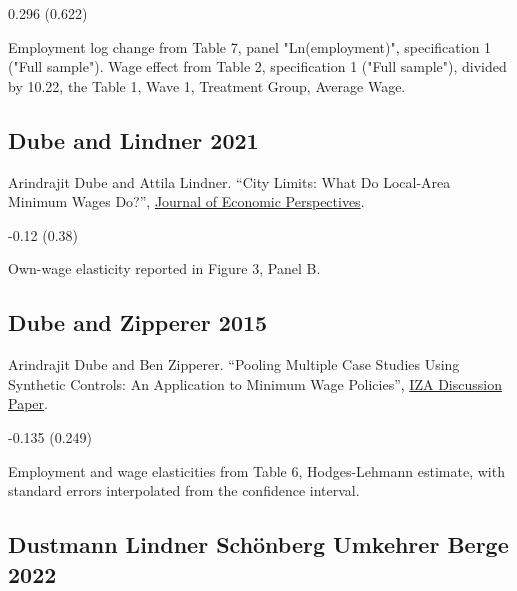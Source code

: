 \vspace{0.7em}

 0.296 (0.622)

\vspace{0.7em}

 Employment log change from Table 7, panel "Ln(employment)", specification 1 ("Full sample"). Wage effect from Table 2, specification 1 ("Full sample"), divided by 10.22, the Table 1, Wave 1, Treatment Group, Average Wage.

\subsection*{Dube and Lindner 2021}
\vspace{-0.7em}

\noindent Arindrajit Dube and Attila Lindner. ``City Limits: What Do Local-Area Minimum Wages Do?'', \href{https://doi.org/10.1257/jep.35.1.27}{Journal of Economic Perspectives}.

\vspace{0.7em}

 -0.12 (0.38)

\vspace{0.7em}

 Own-wage elasticity reported in Figure 3, Panel B.

\subsection*{Dube and Zipperer 2015}
\vspace{-0.7em}

\noindent Arindrajit Dube and Ben Zipperer. ``Pooling Multiple Case Studies Using Synthetic Controls: An Application to Minimum Wage Policies'', \href{https://docs.iza.org/dp8944.pdf}{IZA Discussion Paper}.

\vspace{0.7em}

 -0.135 (0.249)

\vspace{0.7em}

 Employment and wage elasticities from Table 6, Hodges-Lehmann estimate, with standard errors interpolated from the confidence interval.

\subsection*{Dustmann Lindner Schönberg Umkehrer Berge 2022}
\vspace{-0.7em}

